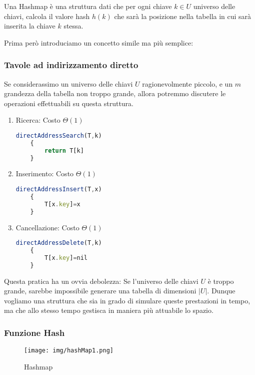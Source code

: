\documentclass{article}
\begin{document}
Una Hashmap è una struttura dati che per ogni chiave $k \in U$ universo delle chiavi, calcola il valore hash $h(k)$ che sarà la posizione nella tabella in cui sarà inserita la chiave $k$ stessa.

Prima però introduciamo un concetto simile ma più semplice:

\subsubsection{Tavole ad indirizzamento diretto} Se considerassimo un universo delle chiavi $U$ ragionevolmente piccolo, e un $m$ grandezza della tabella non troppo grande, allora potremmo discutere le operazioni effettuabili su questa struttura.

\begin{enumerate}
    \item Ricerca: Costo $\Theta(1)$
    
    \begin{lstlisting}[language=JavaScript]
    directAddressSearch(T,k)
    {
        return T[k]
    }
    \end{lstlisting}
    \item Inserimento: Costo $\Theta(1)$
    
    \begin{lstlisting}[language=JavaScript]
    directAddressInsert(T,x)
    {
        T[x.key]=x
    }
    \end{lstlisting}
    \item Cancellazione: Costo $\Theta(1)$
    
    \begin{lstlisting}[language=JavaScript]
    directAddressDelete(T,k)
    {
        T[x.key]=nil
    }
    \end{lstlisting}
\end{enumerate}

Questa pratica ha un ovvia debolezza: Se l'universo delle chiavi $U$ è troppo grande, sarebbe impossibile generare una tabella di dimensioni $|U|$. Dunque vogliamo una struttura che sia in grado di simulare queste prestazioni in tempo, ma che allo stesso tempo gestisca in maniera più attuabile lo spazio.

\newpage

\subsubsection{Funzione Hash}

\begin{figure}[htbp]
        \center
        \texttt{[image: img/hashMap1.png]}
        \caption{Hashmap}
    \end{figure}
\end{document}
